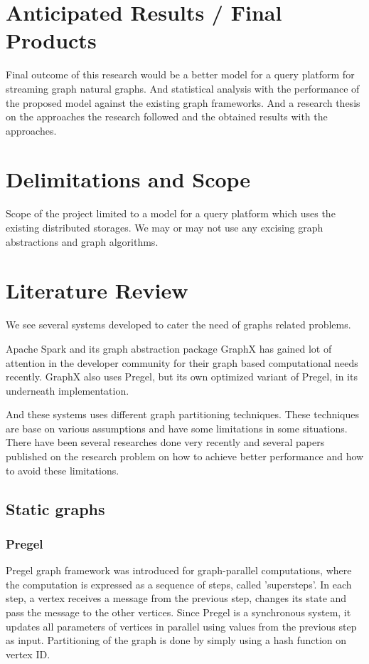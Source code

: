 \documentclass[12pt]{article}
\begin{document}
\clearpage 
\section{Anticipated Results / Final Products }
Final outcome of this research would be a better model for a query platform for streaming graph natural graphs. And statistical analysis with the performance of the proposed model against the existing graph frameworks. And a research thesis on the approaches the research followed and the obtained results with the approaches. 
 
\section{Delimitations and Scope}
Scope of the project limited to a model for a query platform which uses the existing distributed storages. We may or may not use any excising graph abstractions and graph algorithms.

\section{Literature Review}

We see several systems developed to cater the need of graphs related problems.

Apache Spark and its graph abstraction package GraphX\cite{GraphX} has gained lot of attention in the developer community for their graph based computational needs recently. GraphX also uses Pregel, but its own optimized variant of Pregel, in its underneath implementation.

And these systems uses different graph partitioning techniques. These techniques are base on various assumptions and have some limitations in some situations. There have been several researches done very recently and several papers published on the research problem on how to achieve better performance and how to avoid these limitations. 

\subsection{Static graphs}

\subsubsection{Pregel}

Pregel\cite{Pregel} graph framework was introduced for graph-parallel computations, where the computation is expressed as a sequence of steps, called 'supersteps'. In each step, a vertex receives a message from the previous step, changes its state and pass the message to the other vertices. Since Pregel is a synchronous system, it updates all parameters of vertices in parallel using values from the previous step as input. Partitioning of the graph is done by simply using a hash function on vertex ID. 
\end{document}
